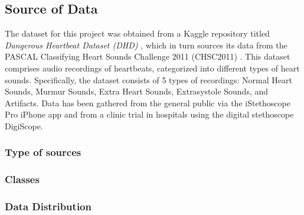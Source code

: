 \subsection{Source of Data}
The dataset for this project was obtained from a Kaggle repository titled \textit{Dangerous Heartbeat Dataset (DHD)} \cite{Dangerous-Heartbeat-Dataset-DHD}, 
which in turn sources its data from the PASCAL Classifying Heart Sounds Challenge 2011 (CHSC2011) \cite{pascal-chsc-2011}. 
This dataset comprises audio recordings of heartbeats, categorized into different types of heart sounds.
Specifically, the dataset consists of 5 types of recordings: Normal Heart Sounds, Murmur Sounds, Extra Heart Sounds, Extrasystole Sounds, and Artifacts.
Data has been gathered from the general public via the iStethoscope Pro iPhone app and from a clinic trial in hospitals using the digital stethoscope DigiScope.

\subsubsection{Type of sources} %

\subsubsection{Classes} %

\subsubsection{Data Distribution} %
